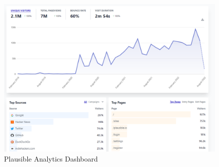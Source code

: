 \begin{description}
    \begin{figure}[!htb]
      \caption{Plausible Analytics Dashboard}\label{fig:plausible}
      \begin{center}
        \includegraphics[width=16cm]{img/6-plausible.png}
      \end{center}
    \end{figure}

\end{description}
